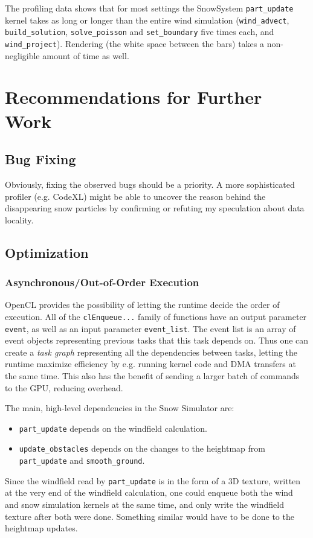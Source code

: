 The profiling data shows that for most settings the SnowSystem \texttt{part\_update} kernel takes as long or longer than the entire wind simulation (\texttt{wind\_advect}, \texttt{build\_solution}, \texttt{solve\_poisson} and \texttt{set\_boundary} five times each, and \texttt{wind\_project}). Rendering (the white space between the bars) takes a non-negligible amount of time as well.

\section{Recommendations for Further Work}
\subsection{Bug Fixing}
Obviously, fixing the observed bugs should be a priority. A more sophisticated profiler (e.g. CodeXL) might be able to uncover the reason behind the disappearing snow particles by confirming or refuting my speculation about data locality. 

\subsection{Optimization}
\subsubsection*{Asynchronous/Out-of-Order Execution}
OpenCL provides the possibility of letting the runtime decide the order of execution. All of the \texttt{clEnqueue...} family of functions have an output parameter \texttt{event}, as well as an input parameter \texttt{event\_list}. The event list is an array of event objects representing previous tasks that this task depends on. Thus one can create a \emph{task graph} representing all the dependencies between tasks, letting the runtime maximize efficiency by e.g. running kernel code and DMA transfers at the same time. This also has the benefit of sending a larger batch of commands to the GPU, reducing overhead.

The main, high-level dependencies in the Snow Simulator are:
\begin{itemize}
\item \texttt{part\_update} depends on the windfield calculation.
\item \texttt{update\_obstacles} depends on the changes to the heightmap from \texttt{part\_update} and \texttt{smooth\_ground}.
\end{itemize}
Since the windfield read by \texttt{part\_update} is in the form of a 3D texture, written at the very end of the windfield calculation, one could enqueue both the wind and snow simulation kernels at the same time, and only write the windfield texture after both were done. Something similar would have to be done to the heightmap updates.

